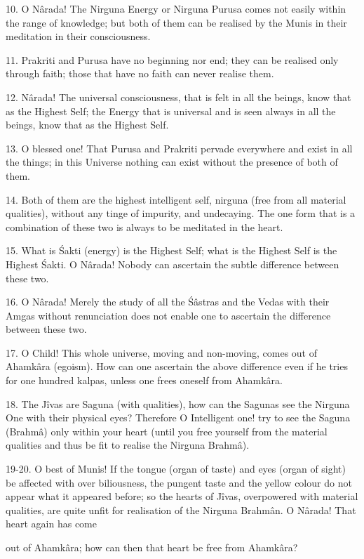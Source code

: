10. O N\^arada! The Nirguna Energy or Nirguna Purusa comes not easily within the range of knowledge; but both of them can be realised by the Munis in their meditation in their consciousness.

11. Prakriti and Purusa have no beginning nor end; they can be realised only through faith; those that have no faith can never realise them.

12. N\^arada! The universal consciousness, that is felt in all the beings, know that as the Highest Self; the Energy that is universal and is seen always in all the beings, know that as the Highest Self.

13. O blessed one! That Purusa and Prakriti pervade everywhere and exist in all the things; in this Universe nothing can exist without the presence of both of them.

14. Both of them are the highest intelligent self, nirguna (free from all material qualities), without any tinge of impurity, and undecaying. The one form that is a combination of these two is always to be meditated in the heart.

15. What is \'Sakti (energy) is the Highest Self; what is the Highest Self is the Highest \'Sakti. O N\^arada! Nobody can ascertain the subtle difference between these two.

16. O N\^arada! Merely the study of all the \'S\^astras and the Vedas with their Amgas without renunciation does not enable one to ascertain the difference between these two.

17. O Child! This whole universe, moving and non-moving, comes out of Ahamk\^ara (egoism). How can one ascertain the above difference even if he tries for one hundred kalpas, unless one frees oneself from Ahamk\^ara.

18. The J\^ivas are Saguna (with qualities), how can the Sagunas see the Nirguna One with their physical eyes? Therefore O Intelligent one! try to see the Saguna (Brahm\^a) only within your heart (until you free yourself from the material qualities and thus be fit to realise the Nirguna Brahm\^a).

19-20. O best of Munis! If the tongue (organ of taste) and eyes (organ of sight) be affected with over biliousness, the pungent taste and the yellow colour do not appear what it appeared before; so the hearts of J\^ivas, overpowered with material qualities, are quite unfit for realisation of the Nirguna Brahm\^an. O N\^arada! That heart again has come

out of Ahamk\^ara; how can then that heart be free from Ahamk\^ara?

